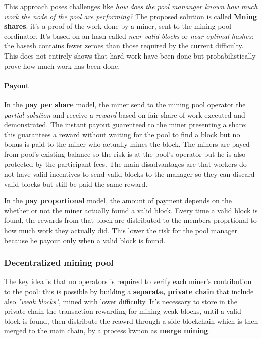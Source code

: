 \documentclass[10pt,a4paper]{report}
\begin{document}
This approach poses challenges like \textit{how does the pool mananger known how much work the node of the pool are performing?}
The proposed solution is called \textbf{Mning shares}: it's a proof of the work done by a miner, sent to the mining pool cordinator. It's based on an hash called \textit{near-valid blocks} or \textit{near optimal hashes}: the hasesh contains fewer zeroes than those required by the current difficulty. This does not entirely shows that hard work have been done but probabilistically prove how much work has been done.
\paragraph{Payout}\label{sec:payout}
In the \textbf{pay per share} model, the miner send to the mining pool operator the \textit{partial solution} and receive a \textit{reward} based on fair share of work executed and demonstrated.
The instant payout guarenteed to the miner presenting a share: this guarantees a reward without waiting for the pool to find a block but no bonus is paid to the miner who actually mines the block. The miners are payed from pool's existing balance so the risk is at the pool's operator but he is also protected by the participant fees.
The main disadvantages are that workers do not have valid incentives to send valid blocks to the manager so they can discard valid blocks but still be paid the same reward.

In the \textbf{pay proportional} model, the amount of payment depends on the whether or not the miner actually found a valid block. Every time a valid block is found, the rewards from that block are distributed to the members proprtional to how much work they actually did.
This lower the risk for the pool manager because he payout only when a valid block is found.
\subsubsection{Decentralized mining pool}\label{sec:decentralized-mining-pool}
The key idea is that no operators is required to verify each miner's contribution to the pool: this is possible by building a \textbf{separate, private chain} that include also \textit{"weak blocks"}, mined with lower difficulty. It's necessary to store in the private chain the transaction rewarding for mining weak blocks, until a valid block is found, then distribute the reawrd through a side blockchain which is then merged to the main chain, by a process kwnon as \textbf{merge mining}.
\end{document}
